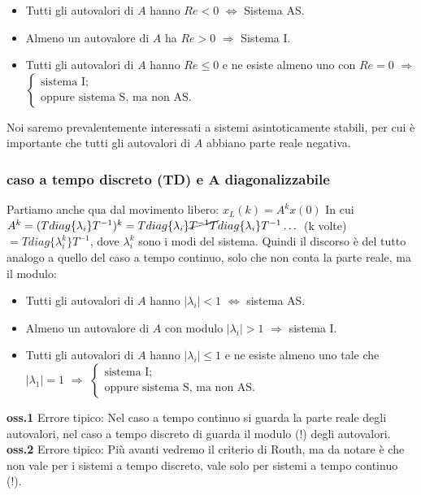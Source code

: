\begin{itemize}
    \item Tutti gli autovalori di $A$ hanno $Re <0$ $\Longleftrightarrow$ Sistema AS.
    \item Almeno un autovalore di $A$ ha $Re > 0$ $\Longrightarrow$ Sistema I.
    \item Tutti gli autovalori di $A$ hanno $Re \leq 0$ e ne esiste almeno uno con $Re = 0$ $\Longrightarrow$ $\begin{cases}
        \text{sistema I;}\;\\
        \text{oppure sistema S, ma non AS.}\;
    \end{cases}$
\end{itemize}
Noi saremo prevalentemente interessati a sistemi asintoticamente stabili, per cui è importante che tutti gli autovalori di $A$ abbiano parte reale negativa.
\subsubsection*{caso a tempo discreto (TD) e A diagonalizzabile}
Partiamo anche qua dal movimento libero: $x_L(k) = A^k x(0)$\newline
\newline
In cui $A^k = (T diag\{\lambda_i\} T^{-1})^k = T diag\{\lambda_i\}\cancel{T^{-1}T} diag\{\lambda_i\} T^{-1} \dots$ (k volte) $= T diag\{\lambda_i^k\}T^{-1}$, dove $\lambda_i^{k}$ sono i modi del sistema.\newline
\newline
Quindi il discorso è del tutto analogo a quello del caso a tempo continuo, solo che non conta la parte reale, ma il modulo:
\begin{itemize}
    \item Tutti gli autovalori di $A$ hanno $|\lambda_i| < 1$ $\Longleftrightarrow$ sistema AS.
    \item Almeno un autovalore di $A$ con modulo $|\lambda_i| > 1$ $\Longrightarrow$ sistema I.
    \item Tutti gli autovalori di $A$ hanno $|\lambda_i| \leq 1$ e ne esiste almeno uno tale che $|\lambda_1| = 1$ $\Longrightarrow$ $\begin{cases}
        \text{sistema I;}\;\\
        \text{oppure sistema S, ma non AS.}\;
    \end{cases}$
\end{itemize}
\textbf{oss.1} Errore tipico: Nel caso a tempo continuo si guarda la parte reale degli autovalori, nel caso a tempo discreto di guarda il modulo (!) degli autovalori.\newline
\newline
\textbf{oss.2} Errore tipico: Più avanti vedremo il criterio di Routh, ma da notare è che non vale per i sistemi a tempo discreto, vale solo per sistemi a tempo continuo (!).
